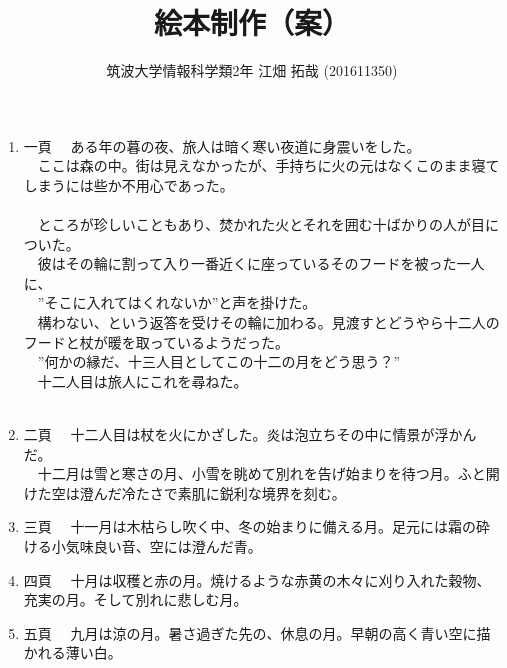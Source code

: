 \documentclass{tarticle}
\author{筑波大学情報科学類2年 江畑 拓哉 (201611350)}
\date{}
\title{絵本制作（案）}
\begin{document}
\maketitle
\begin{enumerate}
\item 一頁
\label{sec:org6bcdf06}
\newline
　ある年の暮の夜、旅人は暗く寒い夜道に身震いをした。\\
　ここは森の中。街は見えなかったが、手持ちに火の元はなくこのまま寝てしまうには些か不用心であった。\\
　\\
　ところが珍しいこともあり、焚かれた火とそれを囲む十ばかりの人が目についた。\\
　彼はその輪に割って入り一番近くに座っているそのフードを被った一人に、\\
　”そこに入れてはくれないか”と声を掛けた。\\
　構わない、という返答を受けその輪に加わる。見渡すとどうやら十二人のフードと杖が暖を取っているようだった。\\
　”何かの縁だ、十三人目としてこの十二の月をどう思う？”\\
　十二人目は旅人にこれを尋ねた。\\
　\\
\item 二頁
\label{sec:orga9fa475}
\newline
　十二人目は杖を火にかざした。炎は泡立ちその中に情景が浮かんだ。\\

　十二月は雪と寒さの月、小雪を眺めて別れを告げ始まりを待つ月。ふと開けた空は澄んだ冷たさで素肌に鋭利な境界を刻む。\\

\item 三頁
\label{sec:orgea9f2b4}
\newline
　十一月は木枯らし吹く中、冬の始まりに備える月。足元には霜の砕ける小気味良い音、空には澄んだ青。\\

\item 四頁
\label{sec:org4795087}
\newline
　十月は収穫と赤の月。焼けるような赤黄の木々に刈り入れた穀物、充実の月。そして別れに悲しむ月。\\

\item 五頁
\label{sec:org1728b2d}
\newline
　九月は涼の月。暑さ過ぎた先の、休息の月。早朝の高く青い空に描かれる薄い白。\\


\end{enumerate}
\end{document}
